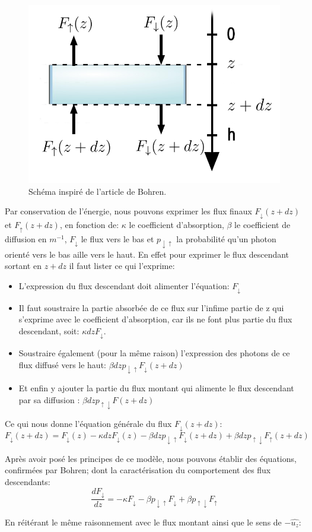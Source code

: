 \documentclass[12pt]{article}
\begin{document}
\begin{figure}
    \centering
    \includegraphics[width=0.5 \textwidth]{Schema/modele.png}
    \caption{Schéma inspiré de l'article de Bohren\cite{textbook}.}
    \label{fig:modeledz}
\end{figure}

Par conservation de l'énergie, nous pouvons exprimer les flux finaux $F_{\downarrow}(z+dz)$ et $F_{\uparrow}(z+dz)$, en fonction de:  $\kappa$ le coefficient d'absorption, $\beta$ le coefficient de diffusion en $m^{-1}$, $F_\downarrow$ le flux vers le bas et $p_{{\downarrow}{\uparrow}}$ la probabilité qu'un photon orienté vers le bas aille vers le haut.
En effet pour exprimer le flux descendant sortant en $z+dz$ il faut lister ce qui l'exprime:
\begin{itemize}
\item L'expression du flux descendant doit alimenter l'équation:
$F_{\downarrow}$
\item Il faut soustraire la partie absorbée de ce flux sur l'infime partie de z qui s'exprime avec le coefficient d'absorption, car ils ne font plus partie du flux descendant, soit: $\kappa dz F_{\downarrow}$.
\item Soustraire également (pour la même raison) l'expression des photons de ce flux diffusé vers le haut: $ \beta dz p_{\downarrow\uparrow} F_{\downarrow}(z+dz)$
\item Et enfin y ajouter la partie du flux montant qui alimente le flux descendant par sa diffusion :
$\beta dz p_{\uparrow\downarrow} F(z+dz)$
\end{itemize}
Ce qui nous donne l'équation générale du flux $F_{\downarrow}(z+dz)$:
\begin{equation}
    F_{\downarrow}(z+dz)=F_{\downarrow}(z)-\kappa dzF_{\downarrow}(z)-\beta dz p_{\downarrow\uparrow} F_{\downarrow}(z+dz)+\beta dz p_{\uparrow\downarrow} F_{\uparrow}(z+dz)
\end{equation}




\par Après avoir posé les principes de ce modèle, nous pouvons établir des équations, confirmées par Bohren; dont la caractérisation du comportement des flux descendants:
\begin{equation}
    \frac{dF_{\downarrow}}{dz}=-\kappa F_{\downarrow}-\beta p_{{\downarrow}{\uparrow}}F_{\downarrow} + \beta p_{{\uparrow}{\downarrow}}F_{\uparrow}
    \label{eq:fluxbas}
\end{equation}
\par
En réitérant le même raisonnement avec le flux montant ainsi que le sens de $-\widehat{u_z}$:
\end{document}
